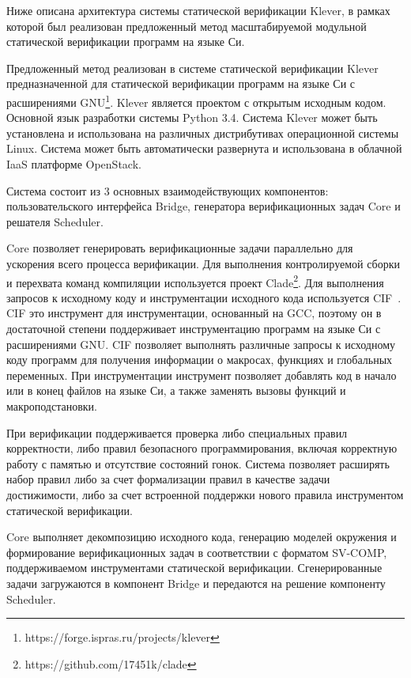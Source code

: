 \documentclass[%
candidate,     %
href,        %
colorlinks,  %
]{disser}
\begin{document}
Ниже описана архитектура системы статической верификации Klever, в рамках которой был реализован предложенный метод масштабируемой модульной статической верификации программ на языке Си.

Предложенный метод реализован в системе статической верификации Klever предназначенной для статической верификации программ на языке Си с расширениями GNU\footnote{https://forge.ispras.ru/projects/klever}.
Klever является проектом с открытым исходным кодом.
Основной язык разработки системы Python 3.4.
Система Klever может быть установлена и использована на различных дистрибутивах операционной системы Linux.
Система может быть автоматически развернута и использована в облачной IaaS платформе OpenStack.

Система состоит из 3 основных взаимодействующих компонентов: пользовательского интерфейса Bridge, генератора верификационных задач Core и решателя Scheduler. 

Core позволяет генерировать верификационные задачи параллельно для ускорения всего процесса верификации.
Для выполнения контролируемой сборки и перехвата команд компиляции используется проект Clade\footnote{https://github.com/17451k/clade}.
Для выполнения запросов к исходному коду и инструментации исходного кода используется CIF~\cite{Novikov2013}.
CIF это инструмент для инструментации, основанный на GCC, поэтому он в достаточной степени поддерживает инструментацию программ на языке Си с расширениями GNU.
CIF позволяет выполнять различные запросы к исходному коду программ для получения информации о макросах, функциях и глобальных переменных.
При инструментации инструмент позволяет добавлять код в начало или в конец файлов на языке Си, а также заменять вызовы функций и макроподстановки.

При верификации поддерживается проверка либо специальных правил корректности, либо правил безопасного программирования, включая корректную работу с памятью и отсутствие состояний гонок.
Система позволяет расширять набор правил либо за счет формализации правил в качестве задачи достижимости, либо за счет встроенной поддержки нового правила инструментом статической верификации.

Core выполняет декомпозицию исходного кода, генерацию моделей окружения и  формирование верификационных задач в соответствии с форматом SV-COMP, поддерживаемом инструментами статической верификации.
Сгенерированные задачи загружаются в компонент Bridge и передаются на решение компоненту Scheduler.
\end{document}
